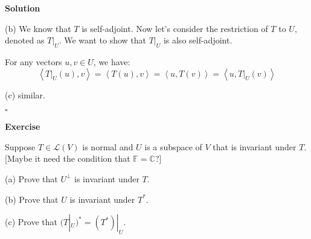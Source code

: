 \documentclass{article}
\newenvironment{exercise}{%
{\textbf{Exercise\\}
    }
}{
}
\newenvironment{solution}{%
{
    \textbf{Solution\\}
    }
}{
  \hfill $\square$ 
  \par\bigskip 
}
\newcommand{\CC}{\mathbb{C}}
\newcommand{\FF}{\mathbb{F}}
\begin{document}
\begin{CJK}{UTF8}{gkai}
\begin{solution}
    (b) We know that $T$ is self-adjoint. Now let's consider the restriction of $T$ to $U$, denoted as $T|_U$. We want to show that $T|_U$ is also self-adjoint.
    
    For any vectors $u, v \in U$, we have:
    \[\left< T|_U(u), v \right> = \left< T(u), v \right>= \left< u, T(v) \right> = \left< u,T|_U(v) \right>\]

    (c) similar.


    






\end{solution}

\begin{exercise}
    Suppose $T \in \mathcal{L}(V)$ is normal and $U$ is a subspace of $V$ that is invariant under $T$. [Maybe it need the condition that $\FF = \CC$?]

    (a) Prove that $U^\bot$ is invariant under $T$.

    (b) Prove that $U$ is invariant under $T^\ast$.

    (c) Prove that $(T|_U)^\ast = (T^\ast)|_U$.


\end{exercise}
\end{CJK}
\end{document}
